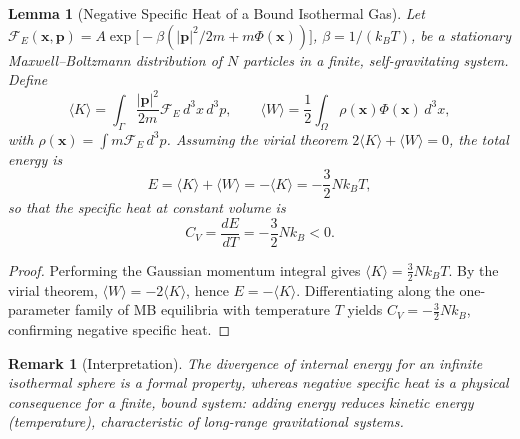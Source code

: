 \documentclass[12pt,a4paper]{article}
\newtheorem{lem}[thm]{Lemma}
\newtheorem{rem}[thm]{Remark}
\numberwithin{equation}{section}
\begin{document}
\begin{lem}[Negative Specific Heat of a Bound Isothermal Gas]
Let $\mathcal{F}_{E}(\mathbf{x},\mathbf{p}) = A \exp\big[-\beta (|\mathbf{p}|^2/2m + m \Phi(\mathbf{x}))\big]$, $\beta=1/(k_B T)$, be a stationary Maxwell--Boltzmann distribution of $N$ particles in a finite, self-gravitating system. Define
\begin{equation}
\langle {K} \rangle = \int_{\Gamma} \frac{|\mathbf{p}|^2}{2m} \mathcal{F}_{E}\, d^3x\,d^3p, \qquad
\langle {W} \rangle = \frac{1}{2} \int_{\Omega} \rho(\mathbf{x}) \Phi(\mathbf{x}) \, d^3x,
\end{equation}
with $\rho(\mathbf{x}) = \int m \mathcal{F}_{E}\, d^3p$. Assuming the virial theorem $2\langle {K}\rangle + \langle {W}\rangle = 0$, the total energy is
\begin{equation}
E = \langle {K}\rangle + \langle {W}\rangle = -\langle {K}\rangle = -\frac{3}{2} N k_B T,
\end{equation}
so that the specific heat at constant volume is
\begin{equation}
C_V = \frac{dE}{dT} = -\frac{3}{2} N k_B < 0.
\end{equation}
\end{lem}
\begin{proof}
Performing the Gaussian momentum integral gives $\langle {K}\rangle = \frac{3}{2} N k_B T$. By the virial theorem, $\langle {W}\rangle = -2\langle {K}\rangle$, hence $E=-\langle {K}\rangle$. Differentiating along the one-parameter family of MB equilibria with temperature $T$ yields $C_V = -\frac{3}{2} N k_B$, confirming negative specific heat.
\end{proof}
\begin{rem}[Interpretation]
The divergence of internal energy for an infinite isothermal sphere is a formal property, whereas negative specific heat is a physical consequence for a finite, bound system: adding energy reduces kinetic energy (temperature), characteristic of long-range gravitational systems.
\end{rem}
\end{document}
